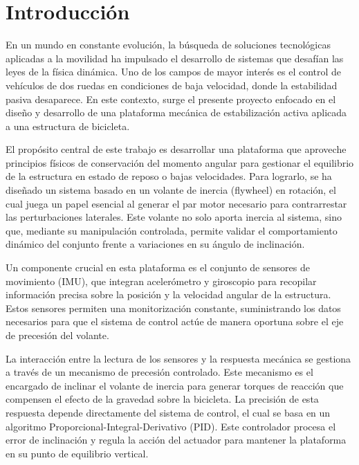\documentclass[12pt,letterpaper]{report}
\begin{document}
\newpage
{}
\setcounter{page}{1}

\chapter{Introducción}

En un mundo en constante evolución, la búsqueda de soluciones tecnológicas aplicadas a la movilidad ha impulsado el desarrollo de sistemas que desafían las leyes de la física dinámica. Uno de los campos de mayor interés es el control de vehículos de dos ruedas en condiciones de baja velocidad, donde la estabilidad pasiva desaparece. En este contexto, surge el presente proyecto enfocado en el diseño y desarrollo de una plataforma mecánica de estabilización activa aplicada a una estructura de bicicleta.

El propósito central de este trabajo es desarrollar una plataforma que aproveche principios físicos de conservación del momento angular para gestionar el equilibrio de la estructura en estado de reposo o bajas velocidades. Para lograrlo, se ha diseñado un sistema basado en un volante de inercia (flywheel) en rotación, el cual juega un papel esencial al generar el par motor necesario para contrarrestar las perturbaciones laterales. Este volante no solo aporta inercia al sistema, sino que, mediante su manipulación controlada, permite validar el comportamiento dinámico del conjunto frente a variaciones en su ángulo de inclinación.

Un componente crucial en esta plataforma es el conjunto de sensores de movimiento (IMU), que integran acelerómetro y giroscopio para recopilar información precisa sobre la posición y la velocidad angular de la estructura. Estos sensores permiten una monitorización constante, suministrando los datos necesarios para que el sistema de control actúe de manera oportuna sobre el eje de precesión del volante.

La interacción entre la lectura de los sensores y la respuesta mecánica se gestiona a través de un mecanismo de precesión controlado. Este mecanismo es el encargado de inclinar el volante de inercia para generar torques de reacción que compensen el efecto de la gravedad sobre la bicicleta. La precisión de esta respuesta depende directamente del sistema de control, el cual se basa en un algoritmo Proporcional-Integral-Derivativo (PID). Este controlador procesa el error de inclinación y regula la acción del actuador para mantener la plataforma en su punto de equilibrio vertical.
\end{document}
